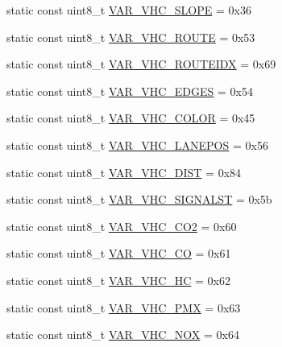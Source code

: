 \begin{DoxyCompactItemize}
\item 
static const uint8\+\_\+t \hyperlink{classtraci__api_1_1_vehicle_manager_a3a811ad4c585a47e9af5fb779a7f97af}{V\+A\+R\+\_\+\+V\+H\+C\+\_\+\+S\+L\+O\+PE} = 0x36
\item 
static const uint8\+\_\+t \hyperlink{classtraci__api_1_1_vehicle_manager_ae6e60c94547d3c6c179c881412a6255f}{V\+A\+R\+\_\+\+V\+H\+C\+\_\+\+R\+O\+U\+TE} = 0x53
\item 
static const uint8\+\_\+t \hyperlink{classtraci__api_1_1_vehicle_manager_a4140fe8382dab1e6dff7d3f6e9116118}{V\+A\+R\+\_\+\+V\+H\+C\+\_\+\+R\+O\+U\+T\+E\+I\+DX} = 0x69
\item 
static const uint8\+\_\+t \hyperlink{classtraci__api_1_1_vehicle_manager_a8ab2241fc88ed80e3f3d4d98930aba13}{V\+A\+R\+\_\+\+V\+H\+C\+\_\+\+E\+D\+G\+ES} = 0x54
\item 
static const uint8\+\_\+t \hyperlink{classtraci__api_1_1_vehicle_manager_a0b76367bca4bf07cb0536cde315201cb}{V\+A\+R\+\_\+\+V\+H\+C\+\_\+\+C\+O\+L\+OR} = 0x45
\item 
static const uint8\+\_\+t \hyperlink{classtraci__api_1_1_vehicle_manager_a430064914b1070d671a96da2bfe76a05}{V\+A\+R\+\_\+\+V\+H\+C\+\_\+\+L\+A\+N\+E\+P\+OS} = 0x56
\item 
static const uint8\+\_\+t \hyperlink{classtraci__api_1_1_vehicle_manager_a86c531540a0204452880c419c16c0076}{V\+A\+R\+\_\+\+V\+H\+C\+\_\+\+D\+I\+ST} = 0x84
\item 
static const uint8\+\_\+t \hyperlink{classtraci__api_1_1_vehicle_manager_a518145e656c215e818588470a5b05ed3}{V\+A\+R\+\_\+\+V\+H\+C\+\_\+\+S\+I\+G\+N\+A\+L\+ST} = 0x5b
\item 
static const uint8\+\_\+t \hyperlink{classtraci__api_1_1_vehicle_manager_a6970833b58d743a2cb22a3db09e5f11b}{V\+A\+R\+\_\+\+V\+H\+C\+\_\+\+C\+O2} = 0x60
\item 
static const uint8\+\_\+t \hyperlink{classtraci__api_1_1_vehicle_manager_a6636934f7ce50a95e51d044d118fb904}{V\+A\+R\+\_\+\+V\+H\+C\+\_\+\+CO} = 0x61
\item 
static const uint8\+\_\+t \hyperlink{classtraci__api_1_1_vehicle_manager_a96ad8b90c3272d7bb7efe3b64501929d}{V\+A\+R\+\_\+\+V\+H\+C\+\_\+\+HC} = 0x62
\item 
static const uint8\+\_\+t \hyperlink{classtraci__api_1_1_vehicle_manager_a76e6186f36d9b755f2dc579a4d57c622}{V\+A\+R\+\_\+\+V\+H\+C\+\_\+\+P\+MX} = 0x63
\item 
static const uint8\+\_\+t \hyperlink{classtraci__api_1_1_vehicle_manager_a52073a98f8b4cd039209a84f8fece983}{V\+A\+R\+\_\+\+V\+H\+C\+\_\+\+N\+OX} = 0x64

\end{DoxyCompactItemize}
